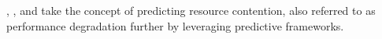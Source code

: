 \cite{Chen_2023_3bbb}, \cite{8748923}, \cite{Melo_Alves_2017} and \cite{6468532} take the concept of predicting resource contention, also referred to as performance degradation further by leveraging predictive frameworks.





